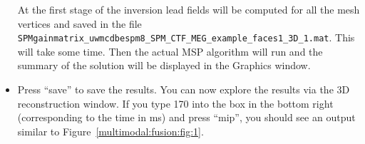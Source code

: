 \begin{itemize}

At the first stage of the inversion lead fields will be computed for all the mesh vertices and saved in the file \texttt{SPMgainmatrix\_uwmcdbespm8\_SPM\_CTF\_MEG\_example\_faces1\_3D\_1.mat}. 
This will take some time.
Then the actual MSP algorithm will run and the summary of the solution will be displayed in the Graphics window.

\item Press ``save'' to save the results. You can now explore the results via the 3D reconstruction window. If you type 170 into the box in the bottom right (corresponding to the time in ms) and press ``mip'', you should see an output similar to Figure~\ref{multimodal:fusion:fig:1}.
\end{itemize}

